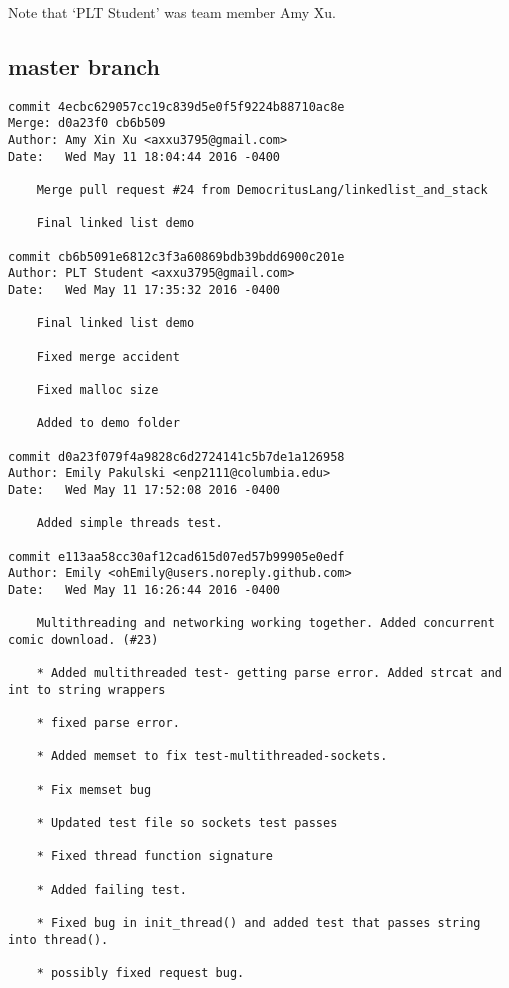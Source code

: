 Note that `PLT Student' was team member Amy Xu.
    
\subsection{master branch}

    \begin{lstlisting}[backgroundcolor=\color{white}]
commit 4ecbc629057cc19c839d5e0f5f9224b88710ac8e
Merge: d0a23f0 cb6b509
Author: Amy Xin Xu <axxu3795@gmail.com>
Date:   Wed May 11 18:04:44 2016 -0400

    Merge pull request #24 from DemocritusLang/linkedlist_and_stack
    
    Final linked list demo

commit cb6b5091e6812c3f3a60869bdb39bdd6900c201e
Author: PLT Student <axxu3795@gmail.com>
Date:   Wed May 11 17:35:32 2016 -0400

    Final linked list demo
    
    Fixed merge accident
    
    Fixed malloc size
    
    Added to demo folder

commit d0a23f079f4a9828c6d2724141c5b7de1a126958
Author: Emily Pakulski <enp2111@columbia.edu>
Date:   Wed May 11 17:52:08 2016 -0400

    Added simple threads test.

commit e113aa58cc30af12cad615d07ed57b99905e0edf
Author: Emily <ohEmily@users.noreply.github.com>
Date:   Wed May 11 16:26:44 2016 -0400

    Multithreading and networking working together. Added concurrent comic download. (#23)
    
    * Added multithreaded test- getting parse error. Added strcat and int to string wrappers
    
    * fixed parse error.
    
    * Added memset to fix test-multithreaded-sockets.
    
    * Fix memset bug
    
    * Updated test file so sockets test passes
    
    * Fixed thread function signature
    
    * Added failing test.
    
    * Fixed bug in init_thread() and added test that passes string into thread().
    
    * possibly fixed request bug.
    

\end{lstlisting}
